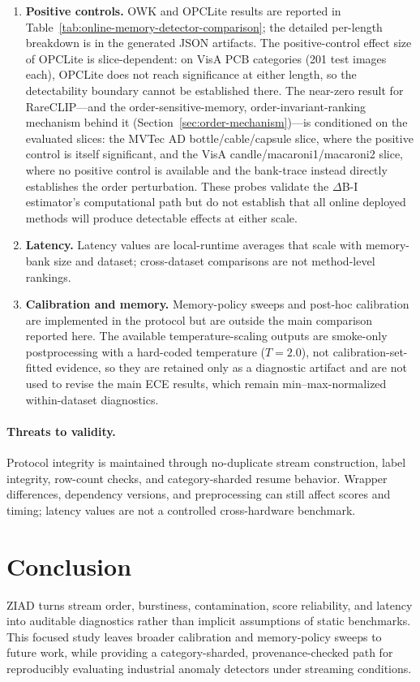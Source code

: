 \documentclass[runningheads]{llncs}
\newcommand{\tabref}[1]{Table~\ref{#1}}
\newcommand{\secref}[1]{Section~\ref{#1}}
\begin{document}
\begin{enumerate}
\item \textbf{Positive controls.} OWK and OPCLite results are reported in
\tabref{tab:online-memory-detector-comparison}; the detailed per-length
breakdown is in the generated JSON artifacts.
The positive-control effect size of OPCLite is slice-dependent: on VisA PCB
categories (201 test images each), OPCLite does not reach significance at
either length, so the detectability boundary cannot be established there.
The near-zero result for RareCLIP---and the order-sensitive-memory,
order-invariant-ranking mechanism behind it (\secref{sec:order-mechanism})---is
conditioned on the evaluated slices: the MVTec AD bottle/cable/capsule slice,
where the positive control is itself significant, and the VisA
candle/macaroni1/macaroni2 slice, where no positive control is available and the
bank-trace instead directly establishes the order perturbation.
These probes validate the $\Delta$B-I estimator's computational path but do
not establish that all online deployed methods will produce detectable effects
at either scale.

\item \textbf{Latency.} Latency values are local-runtime averages that scale
with memory-bank size and dataset; cross-dataset comparisons are not
method-level rankings.

\item \textbf{Calibration and memory.} Memory-policy sweeps and post-hoc
calibration are implemented in the protocol but are outside the main comparison
reported here. The available temperature-scaling outputs are smoke-only
postprocessing with a hard-coded temperature ($T{=}2.0$), not
calibration-set-fitted evidence, so they are retained only as a diagnostic
artifact and are not used to revise the main ECE results, which remain
min--max-normalized within-dataset diagnostics.

\end{enumerate}

\paragraph{Threats to validity.}
Protocol integrity is maintained through no-duplicate stream construction,
label integrity, row-count checks, and category-sharded resume behavior.
Wrapper differences, dependency versions, and preprocessing can still affect
scores and timing; latency values are not a controlled cross-hardware
benchmark.

\section{Conclusion}
ZIAD turns stream order, burstiness, contamination, score reliability, and
latency into auditable diagnostics rather than implicit assumptions of static
benchmarks. This focused study leaves broader calibration and memory-policy
sweeps to future work, while providing a category-sharded, provenance-checked
path for reproducibly evaluating industrial anomaly detectors under streaming
conditions.



\end{document}
